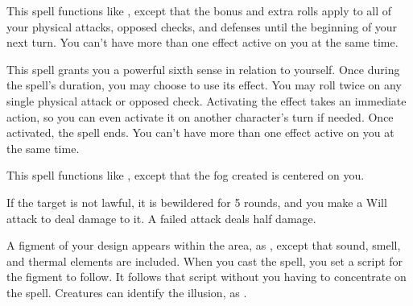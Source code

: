 \spelleffect This spell functions like , except that the bonus and extra rolls apply to all of your physical attacks, opposed checks, and defenses until the beginning of your next turn.
\spellnotes You can't have more than one  effect active on you at the same time.

\spelleffect This spell grants you a powerful sixth sense in relation to yourself. Once during the spell's duration, you may choose to use its effect. You may roll twice on any single physical attack or opposed check. Activating the effect takes an immediate action, so you can even activate it on another character's turn if needed. Once activated, the spell ends.
\spellnotes You can't have more than one  effect active on you at the same time.

\begin{comment}
\subsubsection{O-P}
\end{comment}

\spelleffect This spell functions like , except that the fog created is centered on you.

\spelleffect If the target is not lawful, it is bewildered for 5 rounds, and you make a Will attack to deal damage to it. A failed attack deals half damage.

\spelldur{\durmed \dismissable}
\spellline
\spelleffect A figment of your design appears within the area, as , except that sound, smell, and thermal elements are included. When you cast the spell, you set a script for the figment to follow. It follows that script without you having to concentrate on the spell.
\spellnotes Creatures can identify the illusion, as .

